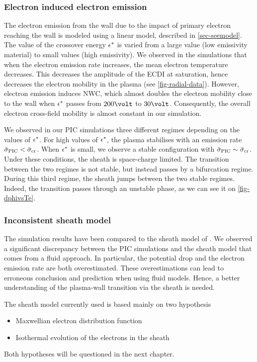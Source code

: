   
  \subsubsection*{Electron induced electron emission}
  
  The electron  emission from the wall due to the impact of primary electron reaching the wall is modeled using a linear model, described in \cref{sec-seemodel}.
  The value of the crossover energy $\epsilon^{*}$ is varied from a large value (low emissivity material) to small values (high emissivity).
  We observed in the simulations that when the electron emission rate increases, the mean electron temperature decreases.
  This decreases the amplitude of the \ac{ECDI} at saturation, hence decreases the electron mobility in the plasma (see \cref{fig-radial-data}).
  However, electron emission induces \ac{NWC}, which almost doubles the electron mobility close to the wall when $\epsilon^{*}$ passes from $200\volt$ to $30\volt$.
  Consequently, the overall electron cross-field mobility is almost constant in our simulation.
  
  We observed in our \ac{PIC} simulations three different regimes depending on the values of $\epsilon^{*}$.
  For high values of $\epsilon^{*}$, the plasma stabilises with an emission rate $ \bar{\sigma }_{\rm PIC} <  \bar{\sigma }_{\rm cr}$.
  When $\epsilon^{*}$ is small, we observe a stable configuration with $ \bar{\sigma }_{\rm PIC} \sim  \bar{\sigma }_{\rm cr}$.
  Under these conditions, the sheath is space-charge limited.
  The transition between the two regimes is not stable, but instead passes by a bifurcation regime.
  During this third regime, the sheath jumps between the two stable regimes.
  Indeed, the transition passes through an unstable phase, as we can see it on \cref{fig-dphivsTe}.
  

  \subsubsection*{Inconsistent sheath model }
  
  The simulation results have been compared to the sheath model of \citet{hobbs1967}.
  We observed a significant discrepancy between the \ac{PIC} simulations and the sheath model that comes from a fluid approach.
  In particular, the potential drop and the electron emission rate are both overestimated.
  These overestimations can lead to erroneous conclusion and prediction when using fluid models.
  Hence, a better understanding of the plasma-wall transition via the sheath is needed.
  
  The sheath model currently used is based mainly on two hypothesis
  \begin{itemize}
    \item Maxwellian electron distribution function
    \item Isothermal evolution of the electrons in the sheath
  \end{itemize}
  
  Both hypotheses will be questioned in the next chapter.
  
